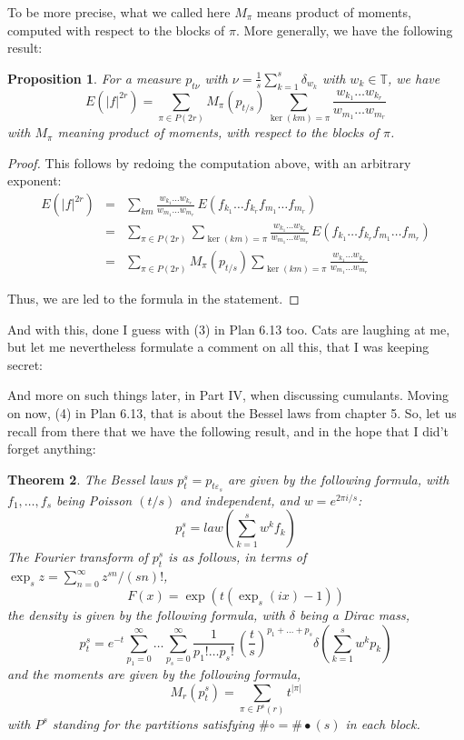 \documentclass[12pt]{amsbook}
\newtheorem{theorem}{Theorem}[chapter]
\newtheorem{comment}[theorem]{Comment}
\newtheorem{proposition}[theorem]{Proposition}
\begin{document}
To be more precise, what we called here $M_\pi$ means product of moments, computed with respect to the blocks of $\pi$. More generally, we have the following result:

\begin{proposition}
For a measure $p_{t\nu}$ with $\nu=\frac{1}{s}\sum_{k=1}^s\delta_{w_k}$ with $w_k\in\mathbb T$, we have
$$E(|f|^{2r})=\sum_{\pi\in P(2r)}M_\pi(p_{t/s})\sum_{\ker{(km)}=\pi}\frac{w_{k_1}\ldots w_{k_r}}{w_{m_1}\ldots w_{m_r}}$$
with $M_\pi$ meaning product of moments, with respect to the blocks of $\pi$.
\end{proposition}

\begin{proof}
This follows by redoing the computation above, with an arbitrary exponent:
\begin{eqnarray*}
E(|f|^{2r})
&=&\sum_{km}\frac{w_{k_1}\ldots w_{k_r}}{w_{m_1}\ldots w_{m_r}}\,E(f_{k_1}\ldots f_{k_r}f_{m_1}\ldots f_{m_r})\\
&=&\sum_{\pi\in P(2r)}\sum_{\ker{(km)}=\pi}\frac{w_{k_1}\ldots w_{k_r}}{w_{m_1}\ldots w_{m_r}}\,E(f_{k_1}\ldots f_{k_r}f_{m_1}\ldots f_{m_r})\\
&=&\sum_{\pi\in P(2r)}M_\pi(p_{t/s})\sum_{\ker{(km)}=\pi}\frac{w_{k_1}\ldots w_{k_r}}{w_{m_1}\ldots w_{m_r}}
\end{eqnarray*}

Thus, we are led to the formula in the statement.
\end{proof}

And with this, done I guess with (3) in Plan 6.13 too. Cats are laughing at me, but let me nevertheless formulate a comment on all this, that I was keeping secret:

And more on such things later, in Part IV, when discussing cumulants. Moving on now, (4) in Plan 6.13, that is about the Bessel laws from chapter 5. So, let us recall from there that we have the following result, and in the hope that I did't forget anything:

\begin{theorem}
The Bessel laws $p_t^s=p_{t\varepsilon_s}$ are given by the following formula, with $f_1,\ldots,f_s$ being Poisson $(t/s)$ and independent, and $w=e^{2\pi i/s}$:
$$p^s_t=law\left(\sum_{k=1}^sw^kf_k\right)$$
The Fourier transform of $p^s_t$ is as follows, in terms of $\exp_sz=\sum_{n=0}^\infty z^{sn}/(sn)!$,
$$F(x)=\exp\left(t(\exp_s(ix)-1)\right)$$
the density is given by the following formula, with $\delta$ being a Dirac mass,
$$p^s_t=e^{-t}\sum_{p_1=0}^\infty\ldots\sum_{p_s=0}^\infty\frac{1}{p_1!\ldots p_s!}\,\left(\frac{t}{s}\right)^{p_1+\ldots+p_s}\delta\left(\sum_{k=1}^sw^kp_k\right)$$
and the moments are given by the following formula,
$$M_r(p^s_t)=\sum_{\pi\in P^s(r)}t^{|\pi|}$$
with $P^s$ standing for the partitions satisfying $\#\circ=\#\bullet(s)$ in each block.
\end{theorem}
\end{document}

